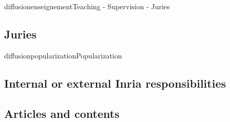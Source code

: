 \documentclass{ra2018}
\begin{document}
\begin{module}{diffusion}{enseignement}{Teaching - Supervision - Juries}
\subsection {Juries}


\end{module}

\begin{module}{diffusion}{popularization}{Popularization}



\subsection{Internal or external Inria responsibilities}

\subsection{Articles and contents}


\end{module}
\end{document}
